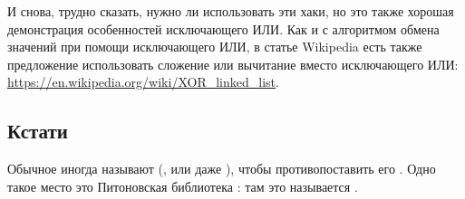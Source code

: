И снова, трудно сказать, нужно ли использовать эти хаки, но это также хорошая демонстрация особенностей исключающего ИЛИ.
Как и с алгоритмом обмена значений при помощи исключающего ИЛИ, в статье Wikipedia есть также предложение использовать
сложение или вычитание вместо исключающего ИЛИ:
\url{https://en.wikipedia.org/wiki/XOR_linked_list}.



\subsection{Кстати}

Обычное  иногда называют  (, или даже ),
чтобы противопоставить его .
Одно такое место это Питоновская библиотека : там это называется .

